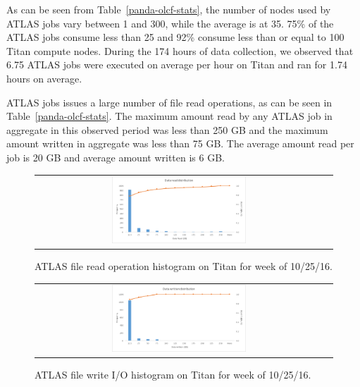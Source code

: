 As can be seen from Table~\ref{panda-olcf-stats}, the number of nodes used by
ATLAS jobs vary between 1 and 300, while the average is at 35. 75\% of the
ATLAS jobs consume less than 25 and 92\% consume less than or equal to 100
Titan compute nodes. During the 174 hours of data collection, we observed that
6.75 ATLAS jobs were executed on average per hour on Titan and ran for
1.74 hours on average.

ATLAS jobs issues a large number of file read operations, as can be seen in
Table~\ref{panda-olcf-stats}. The maximum amount read by any ATLAS job in
aggregate in this observed period was less than 250 GB and the maximum amount
written in aggregate was less than 75 GB\@. The average amount read per job is
20 GB and average amount written is 6 GB\@.

\begin{figure}[!htb]
    \centering
    \begin{tabular}{cc}
        {\includegraphics[width=0.48\textwidth]{figures/panda_data_read_finer_hist.pdf}}\\
    \end{tabular}
    \caption{ATLAS file read operation histogram on Titan for week of 10/25/16.}
\label{fig:atlas-titan-io-read}
\end{figure}



\begin{figure}[!htb]
    \centering
    \begin{tabular}{cc}
        {\includegraphics[width=0.48\textwidth]{figures/panda_data_written_finer_hist.pdf}}\\
    \end{tabular}
    \caption{ATLAS file write I/O histogram on Titan for week of 10/25/16.}
\label{fig:atlas-titan-io-written}
\end{figure}


